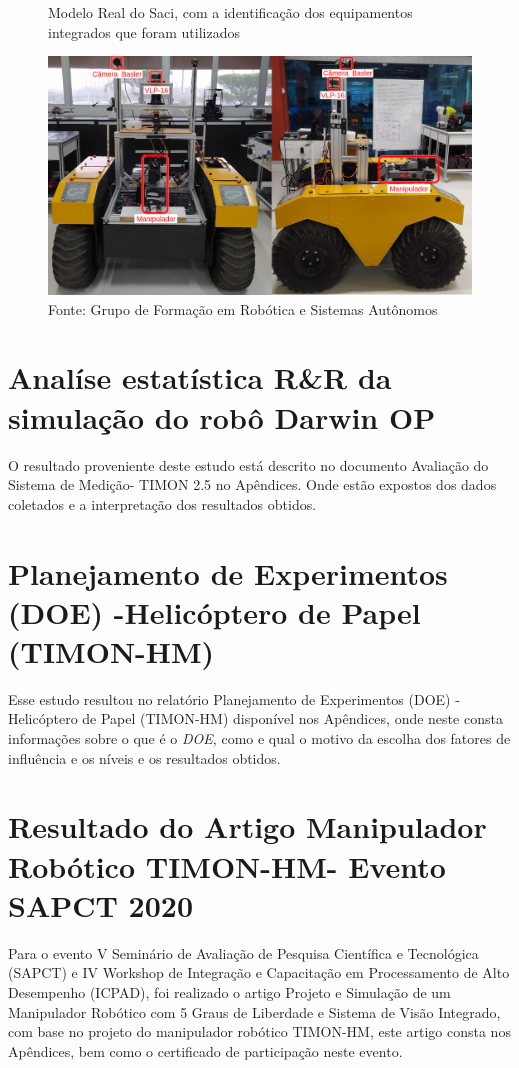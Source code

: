 \begin{figure}[H]
    \caption{Modelo Real do Saci, com a identificação dos equipamentos integrados que foram utilizados}
    \centering
    \includegraphics[width= \textwidth]{Figures/warthog_compo2.png}
    \caption*{Fonte: Grupo de Formação em Robótica e Sistemas Autônomos}
    \label{fig:warthog_desafio_3}
\end{figure}


\section{Analíse estatística R\&R da simulação do robô Darwin OP }
\label{sec:analise_darwin}
O resultado proveniente deste estudo está descrito no documento Avaliação do Sistema de Medição- TIMON 2.5 no Apêndices. Onde estão expostos dos dados coletados e a interpretação dos resultados obtidos.


\section{Planejamento de Experimentos (DOE) -Helicóptero de Papel (TIMON-HM)}
\label{sec:analise_doe}
Esse estudo resultou no relatório Planejamento de Experimentos (DOE) -Helicóptero de Papel (TIMON-HM) disponível nos Apêndices, onde neste consta informações sobre o que é o \textit{DOE}, como e qual o motivo da escolha dos fatores de influência e os níveis e os resultados obtidos. 

\section{Resultado do Artigo Manipulador Robótico TIMON-HM- Evento SAPCT 2020 }
\label{sec:sapct}
Para o evento V Seminário de Avaliação de Pesquisa Científica e Tecnológica (SAPCT) e IV Workshop de Integração e Capacitação em Processamento de Alto Desempenho (ICPAD), foi realizado o artigo Projeto e Simulação de um Manipulador Robótico com 5 Graus de Liberdade e Sistema de Visão Integrado, com base no projeto do manipulador robótico TIMON-HM, este artigo consta nos Apêndices, bem como o certificado de participação neste evento.


